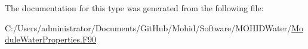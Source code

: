 The documentation for this type was generated from the following file\+:\begin{DoxyCompactItemize}
\item 
C\+:/\+Users/administrator/\+Documents/\+Git\+Hub/\+Mohid/\+Software/\+M\+O\+H\+I\+D\+Water/\mbox{\hyperlink{_module_water_properties_8_f90}{Module\+Water\+Properties.\+F90}}\end{DoxyCompactItemize}

